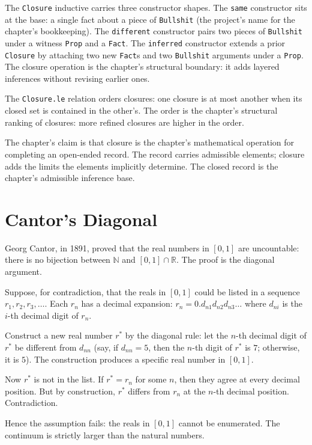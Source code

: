 The \texttt{Closure} inductive carries three constructor shapes.
The \texttt{same} constructor sits at the base: a single fact
about a piece of \texttt{Bullshit} (the project's name for the
chapter's bookkeeping). The \texttt{different} constructor pairs
two pieces of \texttt{Bullshit} under a witness \texttt{Prop} and
a \texttt{Fact}. The \texttt{inferred} constructor extends a prior
\texttt{Closure} by attaching two new \texttt{Fact}s and two
\texttt{Bullshit} arguments under a \texttt{Prop}. The closure
operation is the chapter's structural boundary: it adds layered
inferences without revising earlier ones.

The \texttt{Closure.le} relation orders closures: one closure is
at most another when its closed set is contained in the other's.
The order is the chapter's structural ranking of closures: more
refined closures are higher in the order.

The chapter's claim is that closure is the chapter's mathematical
operation for completing an open-ended record. The record carries
admissible elements; closure adds the limits the elements
implicitly determine. The closed record is the chapter's
admissible inference base.

\section{Cantor's Diagonal}
\label{se:cantors-diagonal}

Georg Cantor, in 1891, proved that the real numbers in $[0, 1]$
are uncountable: there is no bijection between $\mathbb{N}$ and
$[0, 1] \cap \mathbb{R}$. The proof is the diagonal argument.

Suppose, for contradiction, that the reals in $[0, 1]$ could be
listed in a sequence $r_1, r_2, r_3, \ldots$. Each $r_n$ has a
decimal expansion: $r_n = 0.d_{n1} d_{n2} d_{n3} \ldots$ where
$d_{ni}$ is the $i$-th decimal digit of $r_n$.

Construct a new real number $r^*$ by the diagonal rule: let the
$n$-th decimal digit of $r^*$ be different from $d_{nn}$ (say, if
$d_{nn} = 5$, then the $n$-th digit of $r^*$ is $7$; otherwise,
it is $5$). The construction produces a specific real number in
$[0, 1]$.

Now $r^*$ is not in the list. If $r^* = r_n$ for some $n$, then
they agree at every decimal position. But by construction, $r^*$
differs from $r_n$ at the $n$-th decimal position. Contradiction.

Hence the assumption fails: the reals in $[0, 1]$ cannot be
enumerated. The continuum is strictly larger than the natural
numbers.

